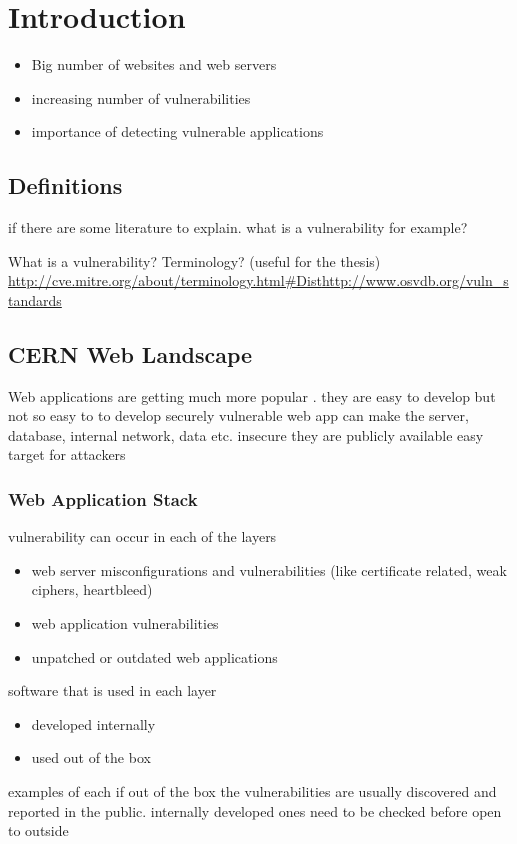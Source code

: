 \chapter{Introduction}
\label{introduction}
\thispagestyle{empty}

\begin{itemize}
\item Big number of websites and web servers
\item increasing number of vulnerabilities
\item importance of detecting vulnerable applications
\end{itemize}

\section{Definitions}
if there are some literature to explain. what is a vulnerability for example?

What is a vulnerability? Terminology? (useful for the thesis) 
\url{http://cve.mitre.org/about/terminology.html#Dist}\url{http://www.osvdb.org/vuln_standards}

\section{CERN Web Landscape}
Web applications are getting much more popular . they are easy to develop but not so easy to to develop securely
vulnerable web app can make the server, database, internal network, data etc. insecure
they are publicly available
easy target for attackers

\subsection{Web Application Stack}
vulnerability can occur in each of the layers
\begin{itemize}
\item web server misconfigurations and vulnerabilities (like certificate related, weak ciphers, heartbleed) 
\item web application vulnerabilities
\item unpatched or outdated web applications
\end{itemize}


software that is used in each layer
\begin{itemize}
\item developed internally
\item used out of the box
\end{itemize}
examples of each
if out of the box the vulnerabilities are usually discovered and reported in the public.
internally developed ones need to be checked before open to outside

